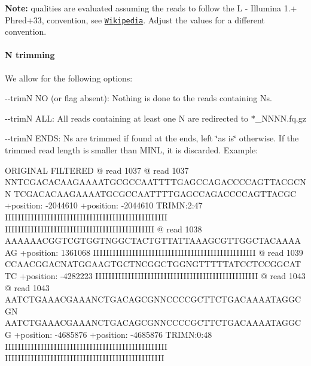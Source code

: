 {\bfseries Note\+:} qualities are evaluated assuming the reads to follow the L -\/ Illumina 1.+ Phred+33, convention, see \href{https://en.wikipedia.org/wiki/FASTQ_format#Encoding}{\tt Wikipedia}. Adjust the values for a different convention.

\paragraph*{N trimming}

We allow for the following options\+:


\begin{DoxyItemize}
\item {\ttfamily -\/-\/trimN NO} (or flag absent)\+: Nothing is done to the reads containing N\textquotesingle{}s.
\item {\ttfamily -\/-\/trimN A\+LL}\+: All reads containing at least one N are redirected to {\ttfamily $\ast$\+\_\+\+N\+N\+NN.fq.\+gz}
\item {\ttfamily -\/-\/trimN E\+N\+DS}\+: N\textquotesingle{}s are trimmed if found at the ends, left \char`\"{}as is\char`\"{} otherwise. If the trimmed read length is smaller than M\+I\+NL, it is discarded. Example\+: 
\begin{DoxyCode}
ORIGINAL                                           FILTERED
@ read 1037                                        @ read 1037
NNTCGACACAAGAAAATGCGCCAATTTTGAGCCAGACCCCAGTTACGCNN TCGACACAAGAAAATGCGCCAATTTTGAGCCAGACCCCAGTTACGC
+position: -2044610                                +position: -2044610  TRIMN:2:47
IIIIIIIIIIIIIIIIIIIIIIIIIIIIIIIIIIIIIIIIIIIIIIIIII IIIIIIIIIIIIIIIIIIIIIIIIIIIIIIIIIIIIIIIIIIIIII
@ read 1038
AAAAAACGGTCGTGGTNGGCTACTGTTATTAAAGCGTTGGCTACAAAAAG
+position: 1361068
IIIIIIIIIIIIIIIIIIIIIIIIIIIIIIIIIIIIIIIIIIIIIIIIII
@ read 1039
CCAACGGACNATGGAAGTGCTNCGGCTGGNGTTTTTATCCTCCGGCATTC
+position: -4282223
IIIIIIIIIIIIIIIIIIIIIIIIIIIIIIIIIIIIIIIIIIIIIIIIII
@ read 1043                                        @ read 1043
AATCTGAAACGAAANCTGACAGCGNNCCCCGCTTCTGACAAAATAGGCGN AATCTGAAACGAAANCTGACAGCGNNCCCCGCTTCTGACAAAATAGGCG
+position: -4685876                                +position: -4685876  TRIMN:0:48
IIIIIIIIIIIIIIIIIIIIIIIIIIIIIIIIIIIIIIIIIIIIIIIIII IIIIIIIIIIIIIIIIIIIIIIIIIIIIIIIIIIIIIIIIIIIIIIIII
\end{DoxyCode}


\end{DoxyItemize}
